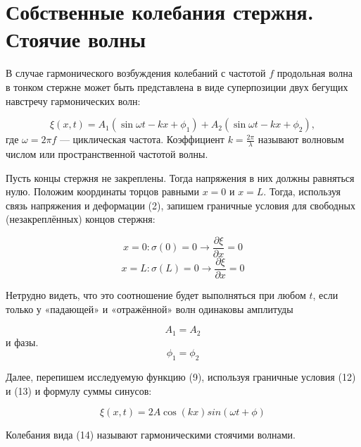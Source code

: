\documentclass[a4paper, 12pt]{article}
\begin{document}
    \section{Собственные колебания стержня. Стоячие волны}
        В случае гармонического возбуждения колебаний с частотой $f$ продольная волна в тонком стержне может быть представлена в виде суперпозиции двух бегущих навстречу гармонических волн:

        \begin{equation}
            \xi(x, t) = A_1 (\sin{\omega t - kx + \phi_1}) + A_2 (\sin{\omega t - kx + \phi_2}),
        \end{equation}
        где $\omega = 2 \pi f$ — циклическая частота. Коэффициент $k = \frac{2 \pi}{\lambda}$ называют
        волновым числом или пространственной частотой волны.
        
        Пусть концы стержня не закреплены. Тогда напряжения в них должны равняться нулю. Положим координаты торцов равными $x = 0$ и $x = L$. Тогда, используя связь напряжения и деформации (2), запишем граничные условия для свободных (незакреплённых) концов стержня:

        \begin{equation}
            x = 0: \sigma(0) = 0 \rightarrow \frac{\partial\xi}{\partial x} = 0
        \end{equation}
        \begin{equation}
            x = L: \sigma(L) = 0 \rightarrow \frac{\partial\xi}{\partial x} = 0
        \end{equation}

        Нетрудно видеть, что это соотношение будет выполняться при любом $t$, если только у «падающей» и «отражённой» волн одинаковы амплитуды 

        \begin{equation}
            A_1 = A_2
        \end{equation}
        и фазы.
        \begin{equation}
            \phi_1 = \phi_2
        \end{equation}
        
        Далее, перепишем исследуемую функцию (9), используя граничные условия (12) и (13) и формулу суммы синусов:

        \begin{equation}
            \xi(x, t) = 2A \cos(kx)sin(\omega t + \phi)
        \end{equation}

        Колебания вида (14) называют гармоническими стоячими волнами.
\end{document}
